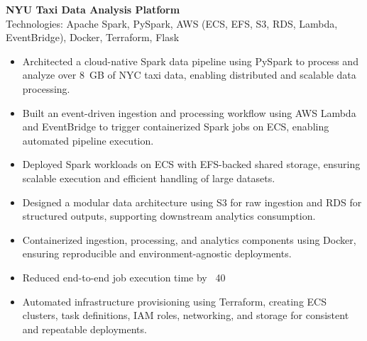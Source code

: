 \documentclass[11pt]{article}
\begin{document}
\textbf{NYU Taxi Data Analysis Platform} \\
Technologies: Apache Spark, PySpark, AWS (ECS, EFS, S3, RDS, Lambda, EventBridge), Docker, Terraform, Flask
\begin{itemize}[leftmargin=15pt,itemsep=-6pt]

\item Architected a cloud-native Spark data pipeline using PySpark to process and analyze over 8~GB of NYC taxi data, enabling distributed and scalable data processing.

\item Built an event-driven ingestion and processing workflow using AWS Lambda and EventBridge to trigger containerized Spark jobs on ECS, enabling automated pipeline execution.

\item Deployed Spark workloads on ECS with EFS-backed shared storage, ensuring scalable execution and efficient handling of large datasets.

\item Designed a modular data architecture using S3 for raw ingestion and RDS for structured outputs, supporting downstream analytics consumption.

\item Containerized ingestion, processing, and analytics components using Docker, ensuring reproducible and environment-agnostic deployments.

\item Reduced end-to-end job execution time by ~40%

\item Automated infrastructure provisioning using Terraform, creating ECS clusters, task definitions, IAM roles, networking, and storage for consistent and repeatable deployments.
\end{itemize}
\end{document}

